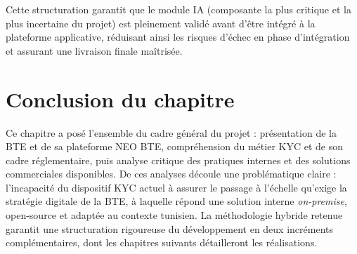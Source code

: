 Cette structuration garantit que le module IA (composante la plus critique et la plus incertaine du projet) est pleinement validé avant d'être intégré à la plateforme applicative, réduisant ainsi les risques d'échec en phase d'intégration et assurant une livraison finale maîtrisée.


\section*{Conclusion du chapitre}

Ce chapitre a posé l'ensemble du cadre général du projet : présentation de la BTE et de sa plateforme NEO BTE, compréhension du métier KYC et de son cadre réglementaire, puis analyse critique des pratiques internes et des solutions commerciales disponibles. De ces analyses découle une problématique claire : l'incapacité du dispositif KYC actuel à assurer le passage à l'échelle qu'exige la stratégie digitale de la BTE, à laquelle répond une solution interne \textit{on-premise}, open-source et adaptée au contexte tunisien. La méthodologie hybride retenue garantit une structuration rigoureuse du développement en deux incréments complémentaires, dont les chapitres suivants détailleront les réalisations.
